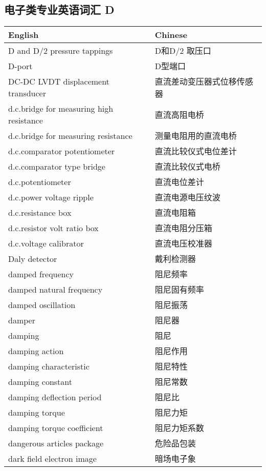 \documentclass[
]{article}
\begin{document}
\hypertarget{ux7535ux5b50ux7c7bux4e13ux4e1aux82f1ux8bedux8bcdux6c47-d}{%
\subsection{\texorpdfstring{电子类专业英语词汇 D
}{电子类专业英语词汇 D }}\label{ux7535ux5b50ux7c7bux4e13ux4e1aux82f1ux8bedux8bcdux6c47-d}}

\begin{longtable}[]{@{}ll@{}}
\toprule()
English & Chinese \\
\midrule()
\endhead
D and D/2 pressure tappings & D和D/2 取压口 \\
D-port & D型端口 \\
DC-DC LVDT displacement transducer & 直流差动变压器式位移传感器 \\
d.c.bridge for measuring high resistance & 直流高阻电桥 \\
d.c.bridge for measuring resistance & 测量电阻用的直流电桥 \\
d.c.comparator potentiometer & 直流比较仪式电位差计 \\
d.c.comparator type bridge & 直流比较仪式电桥 \\
d.c.potentiometer & 直流电位差计 \\
d.c.power voltage ripple & 直流电源电压纹波 \\
d.c.resistance box & 直流电阻箱 \\
d.c.resistor volt ratio box & 直流电阻分压箱 \\
d.c.voltage calibrator & 直流电压校准器 \\
Daly detector & 戴利检测器 \\
damped frequency & 阻尼频率 \\
damped natural frequency & 阻尼固有频率 \\
damped oscillation & 阻尼振荡 \\
damper & 阻尼器 \\
damping & 阻尼 \\
damping action & 阻尼作用 \\
damping characteristic & 阻尼特性 \\
damping constant & 阻尼常数 \\
damping deflection period & 阻尼比 \\
damping torque & 阻尼力矩 \\
damping torque coefficient & 阻尼力矩系数 \\
dangerous articles package & 危险品包装 \\
dark field electron image & 暗场电子象 \\

\end{longtable}
\end{document}

